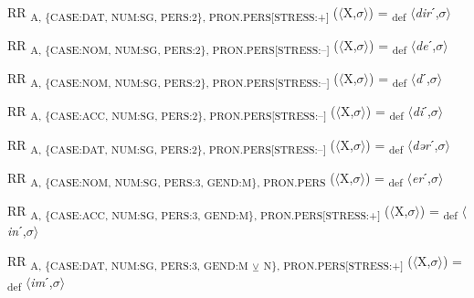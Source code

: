 {\begin{exe}
 RR \textsubscript{A, \{CASE:DAT, NUM:SG, PERS:2\}, PRON.PERS[STRESS:+]} ($\langle$X,$\sigma $$\rangle$) = \textsubscript{def} $\langle$\textit{dir}ˊ,$\sigma $$\rangle$
\end{exe}

\begin{exe}
 RR \textsubscript{A, \{CASE:NOM, NUM:SG, PERS:2\}, PRON.PERS[STRESS:–]} ($\langle$X,$\sigma $$\rangle$) = \textsubscript{def} $\langle$\textit{de}ˊ,$\sigma $$\rangle$
\end{exe}

\begin{exe}
 RR \textsubscript{A, \{CASE:NOM, NUM:SG, PERS:2\}, PRON.PERS[STRESS:–]} ($\langle$X,$\sigma $$\rangle$) = \textsubscript{def} $\langle$\textit{d}ˊ,$\sigma $$\rangle$
\end{exe}

\begin{exe}
 RR \textsubscript{A, \{CASE:ACC, NUM:SG, PERS:2\}, PRON.PERS[STRESS:–]} ($\langle$X,$\sigma $$\rangle$) = \textsubscript{def} $\langle$\textit{di}ˊ,$\sigma $$\rangle$
\end{exe}

\begin{exe}
 RR \textsubscript{A, \{CASE:DAT, NUM:SG, PERS:2\}, PRON.PERS[STRESS:–]} ($\langle$X,$\sigma $$\rangle$) = \textsubscript{def} $\langle$\textit{dər}ˊ,$\sigma $$\rangle$
\end{exe}

\begin{exe}
 RR \textsubscript{A, \{CASE:NOM, NUM:SG, PERS:3, GEND:M\}, PRON.PERS} ($\langle$X,$\sigma $$\rangle$) = \textsubscript{def} $\langle$\textit{er}ˊ,$\sigma $$\rangle$
\end{exe}

\begin{exe}
 RR \textsubscript{A, \{CASE:ACC, NUM:SG, PERS:3, GEND:M\}, PRON.PERS[STRESS:+]} ($\langle$X,$\sigma $$\rangle$) = \textsubscript{def} $\langle$\textit{in}ˊ,$\sigma $$\rangle$
\end{exe}

\begin{exe}
 RR \textsubscript{A, \{CASE:DAT, NUM:SG, PERS:3, GEND:M} \textsubscript{${\veebar}$}\textsubscript{ N\}, PRON.PERS[STRESS:+]} ($\langle$X,$\sigma $$\rangle$) = \textsubscript{def} $\langle$\textit{im}ˊ,$\sigma $$\rangle$
\end{exe}

}
